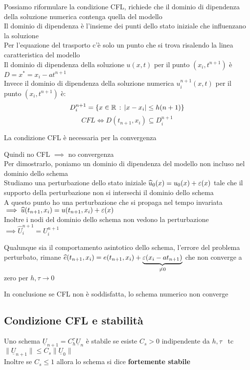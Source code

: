 \documentclass{article}
\renewcommand{\vv}[1]{\underline{#1}}
\begin{document}
Possiamo riformulare la condizione CFL, richiede che il dominio di dipendenza della soluzione numerica contenga quella del modello\\

Il dominio di dipendenza è l'insieme dei punti dello stato iniziale che influenzano la soluzione\\
Per l'equazione del trasporto c'è solo un punto che si trova risalendo la linea caratteristica del modello\\
Il dominio di dipendenza della soluzione $u(x,t)$ per il punto $(x_i,t^{n+1})$ è $D={x^*}={x_i-at^{n+1}}$\\
Invece il dominio di dipendenza della soluzione numerica $u_i^{n+1}(x,t)$ per il punto $(x_i,t^{n+1})$ è: \[D^{n+1}_i = \{ x\in\mathbb R \, : \, |x-x_i|\le h(n+1) \}\]
\[
CFL \Longleftrightarrow D(t_{n+1},x_i)\subseteq D_i^{n+1}
\]

\phantom{}

La condizione CFL è necessaria per la convergenza

Quindi no CFL $\implies$ no convergenza\\
Per dimostrarlo, poniamo un dominio di dipendenza del modello non incluso nel dominio dello schema\\
Studiamo una perturbazione dello stato iniziale $\widehat{u}_0(x)=u_0(x)+\varepsilon(x)$ tale che il supporto della perturbazione non si intersechi il dominio dello schema\\
A questo punto ho una perturbazione che si propaga nel tempo invariata $\implies \widehat{u}(t_{n+1},x_i) = u(t_{n+1},x_i) + \varepsilon(x)$\\
Inoltre i nodi del dominio dello schema non vedono la perturbazione $\implies\hat{U}_i^{n+1}=U_i^{n+1}$

Qualunque sia il comportamento asintotico dello schema, l'errore del problema perturbato, rimane $\widehat{e}(t_{n+1},x_i)= e(t_{n+1},x_i) + \underset{\ne 0}{\underbrace{\varepsilon(x_i-at_{n+1})}}$ che non converge a zero per $h,\tau \to 0$

In conclusione se CFL non è soddisfatta, lo schema numerico non converge \\


\subsection{Condizione CFL e stabilità}

Uno schema $\vv{U}_{n+1}=C_h^{\tau}\vv{U}_n$ è stabile se esiste $C_s>0$ indipendente da $h,\tau$ \, tc \, $\|\vv{U}_{n+1}\|\le C_s \|\vv{U}_0\|$\\
Inoltre se $C_s\le 1$ allora lo schema si dice \textbf{fortemente stabile}\\
\end{document}
